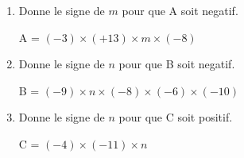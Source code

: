 \begin{exercice*}    
        \begin{enumerate}
            \item Donne le signe de $ m $ pour que A soit negatif.
            
            A = $ (-3) \times (+13)\times m\times (-8) $
            \item Donne le signe de $ n $ pour que B soit negatif. 
            
            B = $ (-9) \times n\times (-8)\times (-6)\times (-10) $ 
            \item Donne le signe de $ n $ pour que C soit positif. 
            
            C = $ (-4) \times (-11)\times n $
        \end{enumerate}
\end{exercice*}
